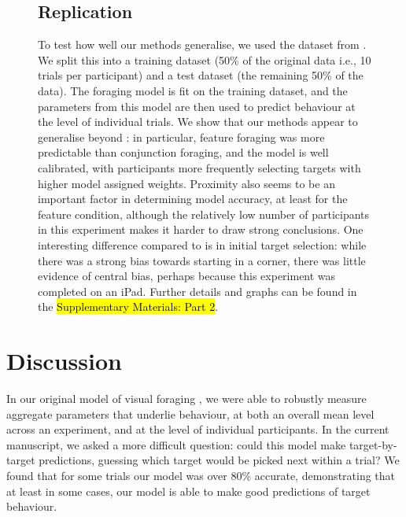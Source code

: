 \documentclass[vision,article,accept,pdftex,moreauthors]{Definitions/mdpi}
\begin{document}
\begin{figure}[H]
\subsection{Replication} 
To test how well our methods generalise, we used the dataset from \citep{kristjansson2014}. We split this into a training dataset (50\% of the original data i.e., 10 trials per participant) and a test dataset (the remaining 50\% of the data). The foraging model is fit on the training dataset, and the parameters from this model are then used to predict behaviour at the level of individual trials. We show that our methods appear to generalise beyond \citep{clarke2022}: in particular, feature foraging was more predictable than conjunction foraging, and the model is well calibrated, with participants more frequently selecting targets with higher model assigned weights. Proximity also seems to be an important factor in determining model accuracy, at least for the feature condition, although the relatively low number of participants in this experiment makes it harder to draw strong conclusions. One interesting difference compared to \citep{clarke2022} is in initial target selection: while there was a strong bias towards starting in a corner, there was little evidence of central bias, perhaps because this experiment was completed on an iPad. Further details and graphs can be found in the \hl{Supplementary Materials: Part 2}.




\label{fig:qjep_init_sel_pred}
\end{figure} 

\section{Discussion}

In our original model of visual foraging \citep{clarke2022foraging}, we were able to robustly measure aggregate parameters that underlie behaviour, at both an overall mean level across an experiment, and at the level of individual participants. In the current manuscript, we asked a more difficult question: could this model make target-by-target predictions, guessing which target would be picked next within a trial? We found that for some trials our model was over 80\% accurate, demonstrating that at least in some cases, our model is able to make good predictions of target behaviour.
\end{document}
